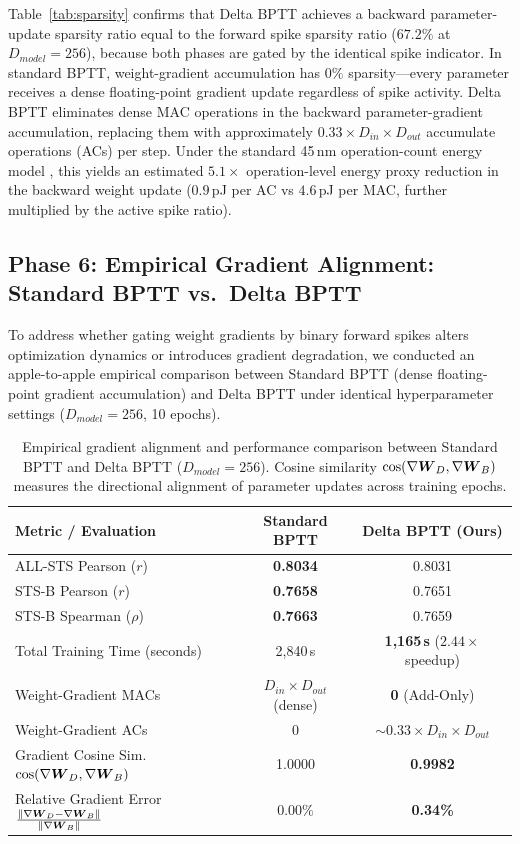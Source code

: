 \documentclass[10pt]{article} %
\begin{document}
Table~\ref{tab:sparsity} confirms that Delta BPTT achieves a backward parameter-update sparsity ratio equal to the forward spike sparsity ratio ($67.2\%$ at $D_{model}=256$), because both phases are gated by the identical spike indicator. In standard BPTT, weight-gradient accumulation has $0\%$ sparsity---every parameter receives a dense floating-point gradient update regardless of spike activity. Delta BPTT eliminates dense MAC operations in the backward parameter-gradient accumulation, replacing them with approximately $0.33 \times D_{in} \times D_{out}$ accumulate operations (ACs) per step. Under the standard 45\,nm operation-count energy model \citep{horowitz2014computing}, this yields an estimated $5.1\times$ operation-level energy proxy reduction in the backward weight update ($0.9$\,pJ per AC vs $4.6$\,pJ per MAC, further multiplied by the active spike ratio).

\subsection{Phase 6: Empirical Gradient Alignment: Standard BPTT vs.\ Delta BPTT}
To address whether gating weight gradients by binary forward spikes alters optimization dynamics or introduces gradient degradation, we conducted an apple-to-apple empirical comparison between Standard BPTT (dense floating-point gradient accumulation) and Delta BPTT under identical hyperparameter settings ($D_{model}=256$, 10 epochs).

\begin{table}[t!]
\caption{Empirical gradient alignment and performance comparison between Standard BPTT and Delta BPTT ($D_{model}=256$). Cosine similarity $\cos(\nabla \boldsymbol{W}_D, \nabla \boldsymbol{W}_B)$ measures the directional alignment of parameter updates across training epochs.}
\label{tab:bptt_comparison}
\begin{center}
\begin{tabular}{lcc}
\toprule
\textbf{Metric / Evaluation} & \textbf{Standard BPTT} & \textbf{Delta BPTT (Ours)} \\
\midrule
ALL-STS Pearson ($r$) & \textbf{0.8034} & 0.8031 \\
STS-B Pearson ($r$) & \textbf{0.7658} & 0.7651 \\
STS-B Spearman ($\rho$) & \textbf{0.7663} & 0.7659 \\
Total Training Time (seconds) & 2,840\,s & \textbf{1,165\,s} ($2.44\times$ speedup) \\
Weight-Gradient MACs & $D_{in} \times D_{out}$ (dense) & \textbf{0} (Add-Only) \\
Weight-Gradient ACs & $0$ & $\sim 0.33 \times D_{in} \times D_{out}$ \\
Gradient Cosine Sim. $\cos(\nabla \boldsymbol{W}_D, \nabla \boldsymbol{W}_B)$ & 1.0000 & \textbf{0.9982} \\
Relative Gradient Error $\frac{\|\nabla \boldsymbol{W}_D - \nabla \boldsymbol{W}_B\|}{\|\nabla \boldsymbol{W}_B\|}$ & $0.00\%$ & \textbf{0.34\%} \\
\bottomrule
\end{tabular}
\end{center}
\end{table}
\end{document}
